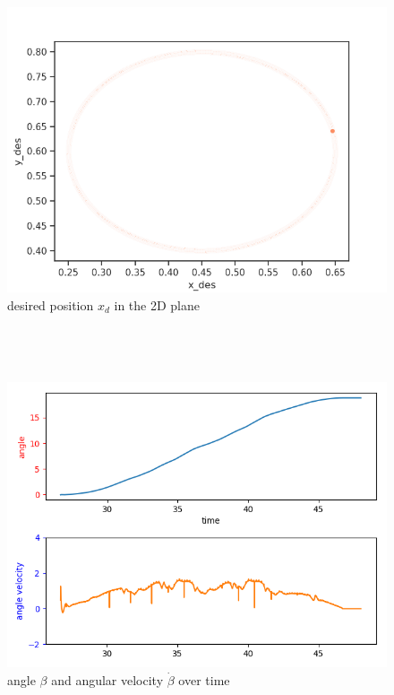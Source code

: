\documentclass[a4paper,10pt]{article}
\begin{document}
\begin{figure}[H]
  \centering
  \includegraphics[scale=0.6]{img/C3_2D_plane_xd}
  \caption{desired position $x_d$ in the 2D plane}
\end{figure}

\subsection{~}

\begin{figure}[H]
  \centering
  \includegraphics[scale=0.6]{img/C4}
  \caption{angle $\beta$ and angular velocity $\dot{\beta}$ over time}
\end{figure}
\end{document}
